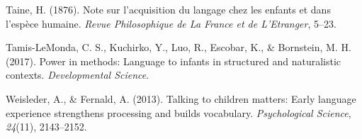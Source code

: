 \documentclass[floatsintext,man]{apa6}
\theoremstyle{definition}
\theoremstyle{definition}
\theoremstyle{definition}
\theoremstyle{remark}
\begin{document}
\hypertarget{ref-taine1876note}{}
Taine, H. (1876). Note sur l'acquisition du langage chez les enfants et
dans l'espèce humaine. \emph{Revue Philosophique de La France et de
L'Etranger}, 5--23.

\hypertarget{ref-tamis2017power}{}
Tamis-LeMonda, C. S., Kuchirko, Y., Luo, R., Escobar, K., \& Bornstein,
M. H. (2017). Power in methods: Language to infants in structured and
naturalistic contexts. \emph{Developmental Science}.

\hypertarget{ref-weisleder2013talking}{}
Weisleder, A., \& Fernald, A. (2013). Talking to children matters: Early
language experience strengthens processing and builds vocabulary.
\emph{Psychological Science}, \emph{24}(11), 2143--2152.
\end{document}
